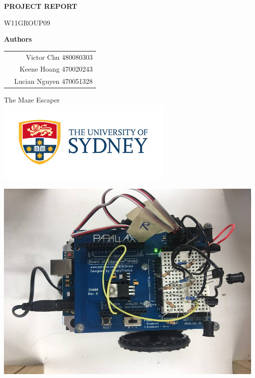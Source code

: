 \documentclass{article}
\begin{document}
\begin{titlepage}
	\begin{center}
		\vspace*{1cm}
		
		\Huge
		\textbf{PROJECT REPORT}
		
		\vspace{0.5cm}
		\LARGE
		W11GROUP09
		
		\vspace{1.5cm}
		
		\textbf{Authors}
		\begin{tabular}{l r}
			& Victor Chu 480080303 \\ & Keene Hoang 470020243 \\ & Lucian Nguyen 470051328
		\end{tabular}
		\vspace{1.8cm}
		
		The Maze Escaper\\
		\vspace{2cm}
		\includegraphics[width=\linewidth]{usyd-logo.jpg}
		\vspace{0.8cm}
		\date{\today} %
		\includegraphics[width=400pt]{pic5.jpg}

		
		
	\end{center}
\end{titlepage}
\tableofcontents
\newpage
\end{document}
